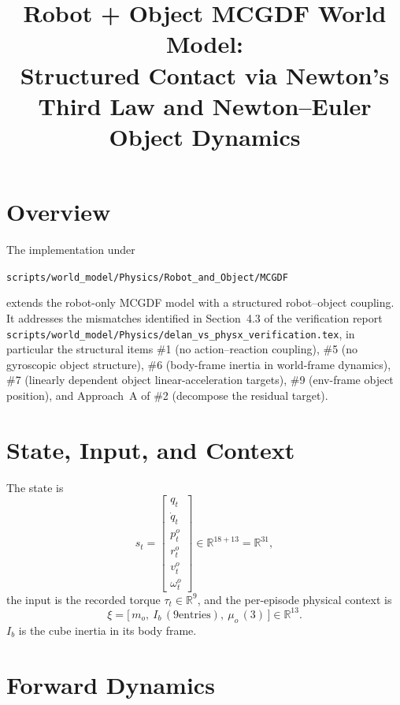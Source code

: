 \documentclass[11pt]{article}
\title{Robot + Object MCGDF World Model:\\Structured Contact via Newton's Third Law and Newton--Euler Object Dynamics}
\author{}
\date{}
\begin{document}
\maketitle

\section{Overview}

The implementation under
\begin{center}
\texttt{scripts/world\_model/Physics/Robot\_and\_Object/MCGDF}
\end{center}
extends the robot-only MCGDF model with a structured robot--object coupling.
It addresses the mismatches identified in Section~4.3 of the verification
report
\texttt{scripts/world\_model/Physics/delan\_vs\_physx\_verification.tex},
in particular the structural items \#1 (no action--reaction coupling), \#5
(no gyroscopic object structure), \#6 (body-frame inertia in world-frame
dynamics), \#7 (linearly dependent object linear-acceleration targets),
\#9 (env-frame object position), and Approach~A of \#2 (decompose the
residual target).

\section{State, Input, and Context}

The state is
\begin{equation}
  s_t =
  \begin{bmatrix}
    q_t \\ \dot q_t \\ p^o_t \\ r^o_t \\ v^o_t \\ \omega^o_t
  \end{bmatrix} \in \mathbb{R}^{18 + 13} = \mathbb{R}^{31},
\end{equation}
the input is the recorded torque $\tau_t \in \mathbb{R}^9$, and the
per-episode physical context is
\begin{equation}
  \xi = \bigl[\,m_o,\ I_b\,\mathrm{(9 entries)},\ \mu_o\,(3)\,\bigr] \in \mathbb{R}^{13}.
\end{equation}
$I_b$ is the cube inertia in its body frame.

\section{Forward Dynamics}
\end{document}
